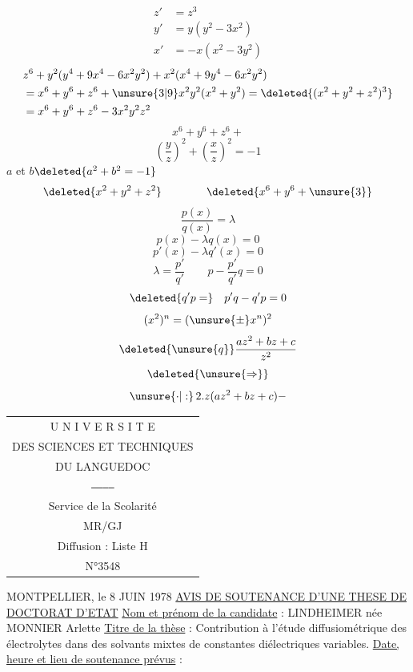 \[
\begin{aligned}
z'&=z^3\\
y'&=y(y^2-3x^2)\\
x'&=-x(x^2-3y^2)
\end{aligned}
\]
\[
\begin{aligned}
&z^6+y^2(y^4+9x^4-6x^2y^2)+x^2(x^4+9y^4-6x^2y^2)\\
&=x^6+y^6+z^6+\unsure{3|9}x^2y^2(x^2+y^2)=\deleted{(x^2+y^2+z^2)^3}\\
&=x^6+y^6+z^6-3x^2y^2z^2
\end{aligned}
\]
\[x^6+y^6+z^6+\]
\[\left(\frac yz\right)^2+\left(\frac xz\right)^2=-1\]
$a$ et $b$\qquad $\deleted{a^2+b^2=-1}$
\[\deleted{x^2+y^2+z^2}\qquad\qquad\deleted{x^6+y^6+\unsure{3}}\]
\[
\frac{p(x)}{q(x)}=\lambda
\]
\[
p(x)-\lambda q(x)=0
\]
\[
p'(x)-\lambda q'(x)=0
\]
\[
\lambda=\frac{p'}{q'}\qquad p-\frac{p'}{q'}q=0
\]
\[
\deleted{q'p=}\quad p'q-q'p=0
\]
\[
(x^2)^n=(\unsure{\pm}x^n)^2
\]
\[
\deleted{\unsure{q}}\frac{az^2+bz+c}{z^2}
\]
\[
\deleted{\unsure{\Rightarrow}}
\]
\[
\unsure{\cdot|:}\,2.z(az^2+bz+c)-
\]

\begin{tabular}{c}
U N I V E R S I T E\\
DES SCIENCES ET TECHNIQUES\\
DU LANGUEDOC\\
\texttt{------------}\\
Service de la Scolarité\\
MR/GJ\\
Diffusion : Liste H\\
N°3548
\end{tabular}

MONTPELLIER, le 8 JUIN 1978
\uline{AVIS DE SOUTENANCE D'UNE THESE DE DOCTORAT D'ETAT}
\uline{Nom et prénom de la candidate} : LINDHEIMER née MONNIER Arlette
\uline{Titre de la thèse} : Contribution à l'étude diffusiométrique des électrolytes dans des solvants mixtes de constantes diélectriques variables.
\uline{Date, heure et lieu de soutenance prévus} :

